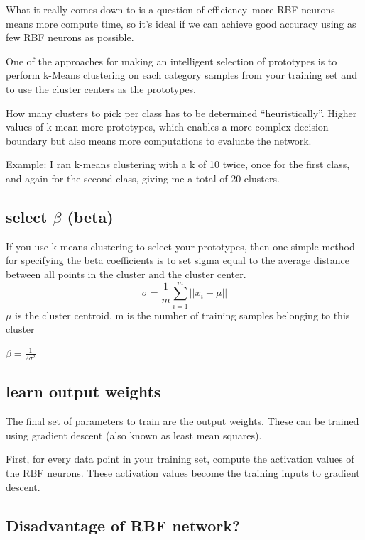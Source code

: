 What it really comes down to is a question of efficiency–more RBF neurons means
more compute time, so it’s ideal if we can achieve good accuracy using as few
RBF neurons as possible.


One of the approaches for making an intelligent selection of prototypes is to
perform k-Means clustering on each category samples from your training set and
to use the cluster centers as the prototypes.

How many clusters to pick per class has to be determined “heuristically”. Higher
values of k mean more prototypes, which enables a more complex decision boundary
but also means more computations to evaluate the network.

Example: I ran k-means clustering with a k of 10 twice, once for the first
class, and again for the second class, giving me a total of 20 clusters.


\subsection{ select $\beta$ (beta)}


If you use k-means clustering to select your prototypes, then one simple method
for specifying the beta coefficients is to set sigma equal to the average
distance between all points in the cluster and the cluster center.
\begin{equation}
\sigma = \frac{1}{m} \sum_{i=1}^m ||x_i - \mu||
\end{equation}
$\mu$ is the cluster centroid, m is the number of training samples belonging to this cluster

$\beta = \frac{1}{2 \sigma^2}$

\subsection{ learn output weights}


The final set of parameters to train are the output weights. These can be
trained using gradient descent (also known as least mean squares).

First, for every data point in your training set, compute the activation values
of the RBF neurons. These activation values become the training inputs to
gradient descent.

\subsection{Disadvantage of RBF network?}


